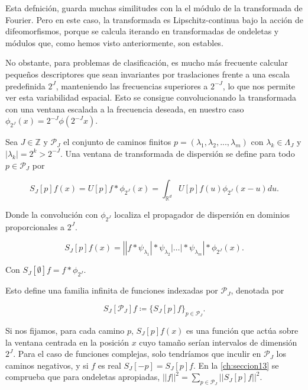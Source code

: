 \noindent Esta defnición, guarda muchas similitudes con la el módulo de la transformada de Fourier. Pero en este caso, la transformada es Lipschitz-continua bajo la acción de difeomorfismos, porque se calcula iterando en transformadas de ondeletas y módulos que, como hemos visto anteriormente, son estables. 

\medskip

\noindent No obstante, para problemas de clasificación, es mucho más frecuente calcular pequeños descriptores que sean invariantes por traslaciones frente a una escala predefinida $2^J$, manteniendo las frecuencias superiores a $2^{-J}$, lo que nos permite ver esta variabilidad espacial. Esto se consigue convolucionando la transformada con una ventana escalada a la frecuencia deseada, en nuestro caso $\phi_{2^J}(x)=2^{-J}\phi(2^{-J}x)$. 

\begin{definicion}
Sea $J \in \mathbb{Z}$ y $\mathcal{P}_J$ el conjunto de caminos finitos $p=(\lambda_1,\lambda_2,...,\lambda_m)$ con $\lambda_k \in \Lambda_J$ y $|\lambda_k|=2^{k}>2^{-J}$. Una ventana de transformada de dispersión se define para todo $p \in \mathcal{P}_J$ por

\begin{equation}
  S_J[p]f(x)=U[p]f \ast \phi_{2^J}(x)=\int_{\mathbb{R}^d}U[p]f(u)\phi_{2^J}(x-u)du.
\end{equation}

\noindent Donde la convolución con $\phi_{2^J}$ localiza el propagador de dispersión en dominios proporcionales a $2^J$.

\begin{equation}
  S_J[p]f(x)=\left| |f \ast \psi_{\lambda_1} | \ast \psi_{\lambda_2} | \ldots | \ast \psi_{\lambda_m} \right| \ast \phi_{2^J}(x).
\end{equation}

Con $S_J[\emptyset] f= f \ast \phi_{2^J}$.
\end{definicion}


\noindent Esto define una familia infinita de funciones indexadas por $\mathcal{P}_J$, denotada por

$$S_J[\mathcal{P}_J]f \coloneqq \lbrace S_J[p]f \rbrace_{p\in\mathcal{P}_J}.$$

\medskip

\noindent Si nos fijamos, para cada camino $p$, $S_J[p]f(x)$ es una función que actúa sobre la ventana centrada en la posición $x$ cuyo tamaño serían intervalos de dimensión $2^J$. Para el caso de funciones complejas, solo tendríamos que inculir en $\mathcal{P}_J$ los caminos negativos, y si $f$ es real $S_J[-p]=S_J[p]f$.
\noindent En la \autoref{ch:seccion13} se comprueba que para ondeletas apropiadas, $||f||^2=\sum_{p\in\mathcal{P}_J}\left|\left|S_J[p]f\right|\right|^2$. 

